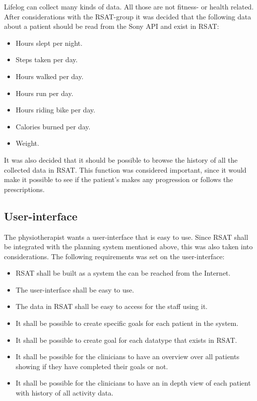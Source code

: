 \documentclass{cslthse-msc}
\begin{document}
Lifelog can collect many kinds of data. All those are not fitness- or health related. After considerations with the RSAT-group it was decided that the following data about a patient should be read from the Sony API and exist in RSAT:

\begin{itemize}
    \item Hours slept per night.
    \item Steps taken per day.
    \item Hours walked per day.
    \item Hours run per day.
    \item Hours riding bike per day.
    \item Calories burned per day.
    \item Weight.
\end{itemize}

It was also decided that it should be possible to browse the history of all the collected data in RSAT. This function was considered important, since it would make it possible to see if the patient’s makes any progression or follows the prescriptions.

\subsection{User-interface}
The physiotherapist wants a user-interface that is easy to use. Since RSAT shall be integrated with the planning system mentioned above, this was also taken into considerations. The following requirements was set on the user-interface:

\begin{itemize}
    \item RSAT shall be built as a system the can be reached from the Internet.
    \item The user-interface shall be easy to use.
    \item The data in RSAT shall be easy to access for the staff using it.
    \item It shall be possible to create specific goals for each patient in the system.
    \item It shall be possible to create goal for each datatype that exists in RSAT.
    \item It shall be possible for the clinicians to have an overview over all patients showing if they have completed their goals or not. 

    \item It shall be possible for the clinicians to have an in depth view of each patient with history of all activity data.

\end{itemize}
\end{document}
